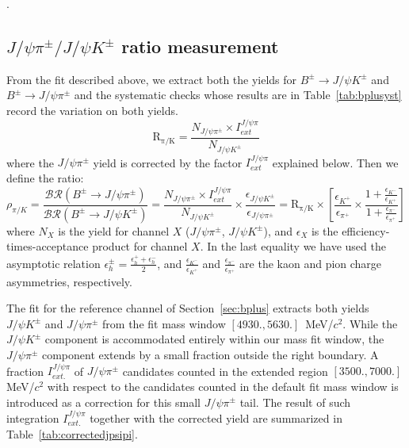 \begin{table}[!htb]
    \begin{center}
	\label{tab:bplusyieldresults}.
    \end{center}
\end{table}

\subsection{$J/\psi \pi^{\pm} / J/\psi K^{\pm}$ ratio measurement}
\label{sec:bpluspikratio}

From the fit described above, we extract both the yields for
$B^{\pm} \to J/\psi K^{\pm}$ and $B^{\pm} \to J/\psi \pi^{\pm}$ and
the systematic checks whose results are in Table~\ref{tab:bplusyst}
record the variation on both yields.
\begin{equation}
    \mathrm{R_{\pi/K}} = 
    \frac{N_{J/\psi \pi^{\pm}}\times I^{J/\psi\pi}_{ext}}{N_{J/\psi K^{\pm}}} 
\end{equation}
where the $J/\psi \pi^{\pm}$ yield is corrected by the factor $I^{J/\psi\pi}_{ext}$
explained below. Then we define the ratio:
\begin{equation}
    \rho_{\pi/K} = \frac{\mathcal{BR}(B^{\pm} \to J/\psi \pi^{\pm} )}
    {\mathcal{BR}(B^{\pm} \to J/\psi K^{\pm}) } 
    = \frac{N_{J/\psi \pi^{\pm}}\times I^{J/\psi\pi}_{ext} }{N_{J/\psi K^{\pm}}}\times
    \frac{\epsilon_{J/\psi K^{\pm} }}{\epsilon_{J/\psi \pi^{\pm}}}
    =\mathrm{R_{\pi/K}} \times 
    \left[\frac{\epsilon_{K^{+}}}{\epsilon_{\pi^{+}}} \times 
    \frac{1+\frac{{\epsilon_{K^{-}}}}{\epsilon_{K^{+}}}}{1+\frac{\epsilon_{\pi^{-}}}{\epsilon_{\pi^{+}}} }\right]
\end{equation}
where $N_{X}$ is the yield for channel $X$ ($J/\psi \pi^{\pm}$,
$J/\psi K^{\pm}$), and $\epsilon_{X}$ is the efficiency-times-acceptance
product for channel $X$.
In the last equality we have used the asymptotic relation
$\epsilon_h^\pm = \frac{\epsilon_h^+ + \epsilon_h^-}{2}$, and
$\frac{\epsilon_{K^{-}}}{\epsilon_{K^{+}}}$ and
$\frac{\epsilon_{\pi^{-}}}{\epsilon_{\pi^{+}}}$ are the kaon and pion
charge asymmetries, respectively.

The fit for the reference channel of Section~\ref{sec:bplus} extracts both
yields $J/\psi K^{\pm}$ and $J/\psi \pi^{\pm}$ from the fit mass window
$[4930.,5630.]$~MeV/$c^2$. While the $J/\psi K^{\pm}$ component is accommodated
entirely within our mass fit window, the $J/\psi \pi^{\pm}$ component extends
by a small fraction outside the right boundary. A fraction $I^{J/\psi \pi}_{ext.}$  of $J/\psi \pi^{\pm}$ candidates counted in the extended region $[3500.,7000.]$ MeV/$c^2$ with respect to the candidates counted in the default fit mass window is introduced as a correction for this small $J/\psi \pi^{\pm}$ tail. The result of such integration
$I^{J/\psi \pi}_{ext.}$ together with the corrected yield are summarized in
Table~\ref{tab:correctedjpsipi}. 

